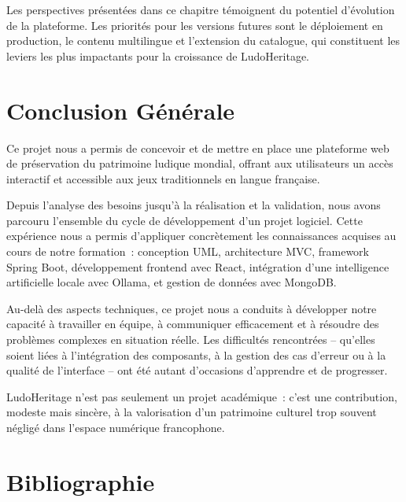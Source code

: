 \documentclass[12pt,a4paper]{report}
\begin{document}
Les perspectives présentées dans ce chapitre témoignent du potentiel d'évolution de
la plateforme. Les priorités pour les versions futures sont le déploiement en production,
le contenu multilingue et l'extension du catalogue, qui constituent les leviers les plus
impactants pour la croissance de LudoHeritage.

\newpage
\chapter*{Conclusion Générale}
\thispagestyle{fancy}

Ce projet nous a permis de concevoir et de mettre en place une plateforme web de
préservation du patrimoine ludique mondial, offrant aux utilisateurs un accès interactif
et accessible aux jeux traditionnels en langue française.

Depuis l'analyse des besoins jusqu'à la réalisation et la validation, nous avons parcouru
l'ensemble du cycle de développement d'un projet logiciel. Cette expérience nous a permis
d'appliquer concrètement les connaissances acquises au cours de notre formation~: conception
UML, architecture MVC, framework Spring Boot, développement frontend avec React, intégration
d'une intelligence artificielle locale avec Ollama, et gestion de données avec MongoDB.

Au-delà des aspects techniques, ce projet nous a conduits à développer notre capacité à
travailler en équipe, à communiquer efficacement et à résoudre des problèmes complexes
en situation réelle. Les difficultés rencontrées -- qu'elles soient liées à l'intégration
des composants, à la gestion des cas d'erreur ou à la qualité de l'interface -- ont été
autant d'occasions d'apprendre et de progresser.

LudoHeritage n'est pas seulement un projet académique~: c'est une contribution, modeste
mais sincère, à la valorisation d'un patrimoine culturel trop souvent négligé dans l'espace
numérique francophone.

\newpage
\chapter*{Bibliographie}
\thispagestyle{fancy}
\end{document}
